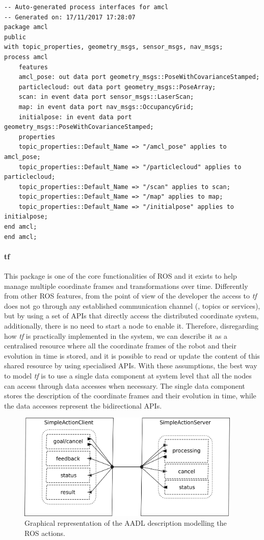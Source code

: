 \begin{lstlisting}[language=AADL,caption={Auto-generated AADL to model the amcl package and the amcl node},label=lst:legacy-nodes]
-- Auto-generated process interfaces for amcl
-- Generated on: 17/11/2017 17:28:07
package amcl
public
with topic_properties, geometry_msgs, sensor_msgs, nav_msgs;
process amcl
	features
	amcl_pose: out data port geometry_msgs::PoseWithCovarianceStamped;
	particlecloud: out data port geometry_msgs::PoseArray;
	scan: in event data port sensor_msgs::LaserScan;
	map: in event data port nav_msgs::OccupancyGrid;
	initialpose: in event data port geometry_msgs::PoseWithCovarianceStamped;
	properties
	topic_properties::Default_Name => "/amcl_pose" applies to amcl_pose;
	topic_properties::Default_Name => "/particlecloud" applies to particlecloud;
	topic_properties::Default_Name => "/scan" applies to scan;
	topic_properties::Default_Name => "/map" applies to map;
	topic_properties::Default_Name => "/initialpose" applies to initialpose;
end amcl;
end amcl;	
\end{lstlisting}

\paragraph{tf} This package is one of the core functionalities of ROS and it exists to help manage multiple coordinate frames and transformations over time. Differently from other ROS features, from the point of view of the developer the access to \textit{tf} does not go through any established communication channel (\ie, topics or services), but by using a set of APIs that directly access the distributed coordinate system, additionally, there is no need to start a node to enable it. Therefore, disregarding how \textit{tf} is practically implemented in the system, we can describe it as a centralised resource where all the coordinate frames of the robot and their evolution in time is stored, and it is possible to read or update the content of this shared resource by using specialised APIs. With these assumptions, the best way to model \textit{tf} is to use a single data component at system level that all the nodes can access through data accesses when necessary. The single data component stores the description of the coordinate frames and their evolution in time, while the data accesses represent the bidirectional APIs.

\begin{figure}[t]
    \centering
    \includegraphics[width=0.95\textwidth]{gfx/action}
    \caption{Graphical representation of the AADL description modelling the ROS actions.}\label{fig:action}
\end{figure}

